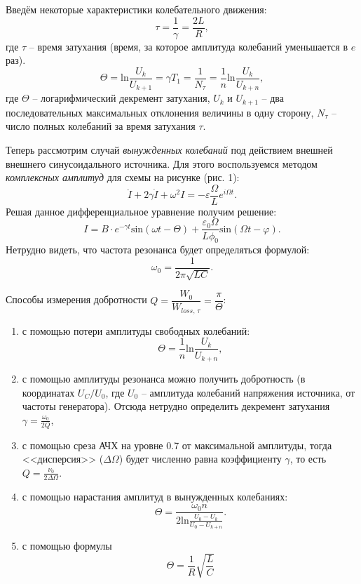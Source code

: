 \documentclass[a4paper,12pt]{article}
\theoremstyle{definition}
\begin{document}
Введём некоторые характеристики колебательного движения:
\begin{equation}
    \tau = \frac{1}{\gamma} = \frac{2L}{R},
\end{equation}
где $\tau$ -- время затухания (время, за которое амплитуда колебаний уменьшается в $e$ раз).
\begin{equation}
    \Theta = \text{ln} \frac{U_k}{U_{k+1}} = \gamma T_1 = \frac{1}{N_\tau} = \frac{1}{n} \text{ln} \frac{U_k}{U_{k+n}}, 
\end{equation}
где $\Theta$ -- логарифмический декремент затухания, $U_k$ и $U_{k+1}$ -- два последовательных максимальных отклонения величины в одну сторону, $N_\tau$ -- число полных колебаний за время затухания $\tau$.

Теперь рассмотрим случай \textit{вынужденных колебаний} под действием внешней внешнего синусоидального источника. Для этого воспользуемся методом \textit{комплексных амплитуд} для схемы на рисунке (рис. 1):
\begin{equation}
    \ddot{I} + 2 \gamma \dot{I} + \omega^2 I = - \varepsilon \frac{\Omega}{L} e^{i\Omega t}.
\end{equation}
Решая данное дифференциальное уравнение получим решение:
\begin{equation}
    I = B\cdot e^{-\gamma t} \text{sin}(\omega t - \Theta) + \frac{\varepsilon_0 \Omega}{L \phi_0} \text{sin} (\Omega t - \varphi).
\end{equation}
Нетрудно видеть, что частота резонанса будет определяться формулой:
\begin{equation}
    \omega_0 = \frac{1}{2 \pi \sqrt{LC}}.
\end{equation}

Способы измерения добротности $Q = \dfrac{W_0}{W_{loss,\,\tau}} = \dfrac{\pi}{\Theta}$:
\begin{enumerate}
    \item с помощью потери амплитуды свободных колебаний: 
    \begin{equation}
        \Theta = \frac{1}{n} \text{ln}\frac{U_k}{U_{k+n}},
    \end{equation}
    \item с помощью амплитуды резонанса можно получить добротность (в координатах $U_C/U_0$, где $U_0$ -- амплитуда колебаний напряжения источника, от частоты генератора). Отсюда нетрудно определить декремент затухания $\gamma = \frac{\omega_0}{2Q}$,
    \item с помощью среза АЧХ на уровне 0.7 от максимальной амплитуды, тогда <<дисперсия>> ($\Delta \Omega$) будет численно равна коэффициенту $\gamma$, то есть $Q = \frac{\nu_0}{2 \Delta \Omega}$.
    \item с помощью нарастания амплитуд в вынужденных колебаниях:
    \begin{equation}
        \Theta = \frac{\omega_0 n}{2\text{ln} \frac{U_0 - U_k}{U_0 - U_{k+n}}}.
    \end{equation}
    \item  с помощью формулы\begin{equation}
        \Theta = \frac{1}{R}\sqrt{\frac{L}{C}}
    \end{equation}
\end{enumerate}
\end{document}
